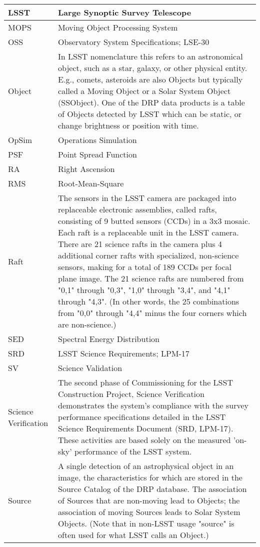 \begin{longtable}{|l|p{}|}
LSST & Large Synoptic Survey Telescope \\\hline
MOPS & Moving Object Processing System \\\hline
OSS & Observatory System Specifications; LSE-30 \\\hline
Object & In LSST nomenclature this refers to an astronomical object, such as a star, galaxy, or other physical entity. E.g., comets, asteroids are also Objects but typically called a Moving Object or a Solar System Object (SSObject). One of the DRP data products is a table of Objects detected by LSST which can be static, or change brightness or position with time. \\\hline
OpSim & Operations Simulation \\\hline
PSF & Point Spread Function \\\hline
RA & Right Ascension \\\hline
RMS & Root-Mean-Square \\\hline
Raft & The sensors in the LSST camera are packaged into replaceable electronic assemblies, called rafts, consisting of 9 butted sensors (CCDs) in a 3x3 mosaic. Each raft is a replaceable unit in the LSST camera. There are 21 science rafts in the camera plus 4 additional corner rafts with specialized, non-science sensors, making for a total of 189 CCDs per focal plane image. The 21 science rafts are numbered from "0,1" through "0,3", "1,0" through "3,4", and "4,1" through "4,3". (In other words, the 25 combinations from "0,0" through "4,4" minus the four corners which are non-science.) \\\hline
SED & Spectral Energy Distribution \\\hline
SRD & LSST Science Requirements; LPM-17 \\\hline
SV & Science Validation \\\hline
Science Verification & The second phase of Commissioning for the LSST Construction Project, Science Verification demonstrates the system's compliance with the survey performance specifications detailed in the LSST Science Requirements Document (SRD, LPM-17). These activities are based solely on the measured 'on-sky' performance of the LSST system. \\\hline
Source & A single detection of an astrophysical object in an image, the characteristics for which are stored in the Source Catalog of the DRP database. The association of Sources that are non-moving lead to Objects; the association of moving Sources leads to Solar System Objects. (Note that in non-LSST usage "source" is often used for what LSST calls an Object.) \\\hline

\end{longtable}
